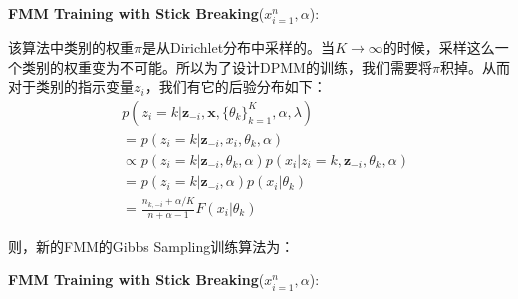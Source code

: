 \begin{minipage}{0.8\textwidth}\centering
\begin{algorithm}[H]
\textbf{FMM Training with Stick Breaking}($x_{i=1}^{n}, \alpha$):\\
\end{algorithm}
\end{minipage}

该算法中类别的权重$\pi$是从Dirichlet分布中采样的。当$K \to \infty$的时候，采样这么一个类别的权重变为不可能。所以为了设计DPMM的训练，我们需要将$\pi$积掉。从而对于类别的指示变量$z_i$，我们有它的后验分布如下：
\begin{displaymath}
\begin{split}
&p(z_i=k | \mathbf{z}_{-i}, \mathbf{x}, \{\theta_k\}_{k=1}^{K}, \alpha, \lambda)\\
&= p(z_i=k |\mathbf{z}_{-i}, x_i, \theta_k, \alpha)\\
& \propto p(z_i=k|  \mathbf{z}_{-i}, \theta_k, \alpha)p(x_i|z_i=k, \mathbf{z}_{-i}, \theta_k, \alpha)\\
&= p(z_i=k | \mathbf{z}_{-i}, \alpha)p(x_i|\theta_k)\\
&=\frac{n_{k, -i}+\alpha / K}{n+\alpha -1} F(x_i|\theta_k)
\end{split}
\end{displaymath}

则，新的FMM的Gibbs Sampling训练算法为：

\begin{minipage}{0.8\textwidth}\centering
\begin{algorithm}[H]
\textbf{FMM Training with Stick Breaking}($x_{i=1}^{n}, \alpha$):\\
\end{algorithm}
\end{minipage}
 
